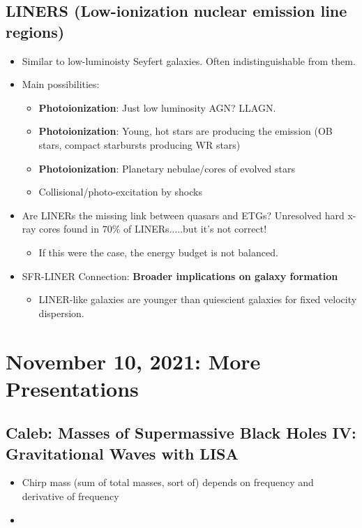 \documentclass{article}
\begin{document}
\subsection{LINERS (Low-ionization nuclear emission line regions)}

\begin{itemize}
    \item Similar to low-luminoisty Seyfert galaxies. Often indistinguishable from them.
    \item Main possibilities:
    \begin{itemize}
        \item \textbf{Photoionization}: Just low luminosity AGN? LLAGN.
        \item \textbf{Photoionization}: Young, hot stars are producing the emission (OB stars, compact starbursts producing WR stars)
        \item \textbf{Photoionization}: Planetary nebulae/cores of evolved stars
        \item Collisional/photo-excitation by shocks
    \end{itemize}
    \item Are LINERs the missing link between quasars and ETGs? Unresolved hard x-ray cores found in $70\%$ of LINERs.....but it's not correct!
    \begin{itemize}
        \item If this were the case, the energy budget is not balanced. 
    \end{itemize}
    \item SFR-LINER Connection: \textbf{Broader implications on galaxy formation}
    \begin{itemize}
        \item LINER-like galaxies are younger than quiescient galaxies for fixed velocity dispersion.
    \end{itemize}
\end{itemize}


\section{November 10, 2021: More Presentations}

\subsection{Caleb: Masses of Supermassive Black Holes IV: Gravitational Waves with LISA}

\begin{itemize}
    \item Chirp mass (sum of total masses, sort of) depends on frequency and derivative of frequency
    \item 
\end{itemize}
\end{document}
